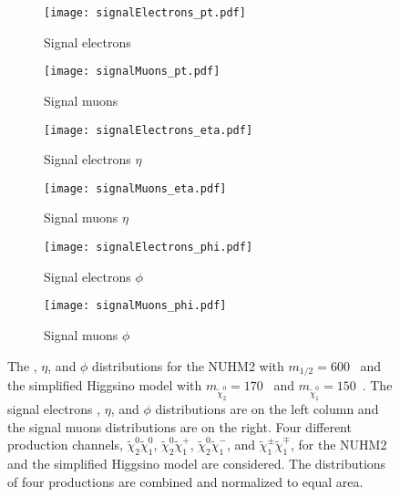 \begin{figure}[htbp]
    \begin{center}
        \begin{subfigure}[b]{0.48\textwidth}
            \texttt{[image: signalElectrons\_pt.pdf]}
            \caption{Signal electrons \pt}
        \end{subfigure}
        \begin{subfigure}[b]{0.48\textwidth}
            \texttt{[image: signalMuons\_pt.pdf]}
            \caption{Signal muons \pt}
        \end{subfigure}
        \begin{subfigure}[b]{0.48\textwidth}
            \texttt{[image: signalElectrons\_eta.pdf]}
            \caption{Signal electrons $\eta$}
        \end{subfigure}
        \begin{subfigure}[b]{0.48\textwidth}
            \texttt{[image: signalMuons\_eta.pdf]}
            \caption{Signal muons $\eta$}
        \end{subfigure}
        \begin{subfigure}[b]{0.48\textwidth}
            \texttt{[image: signalElectrons\_phi.pdf]}
            \caption{Signal electrons $\phi$}
        \end{subfigure}
        \begin{subfigure}[b]{0.48\textwidth}
            \texttt{[image: signalMuons\_phi.pdf]}
            \caption{Signal muons $\phi$}
        \end{subfigure}
    \end{center}
    \caption{The \pt, $\eta$, and $\phi$ distributions for the NUHM2 with $m_{1/2} = 600$~{\GeV} and the simplified Higgsino model with $m_{\widetilde{\chi}^{0}_{2}}=170$~{\GeV} and $m_{\widetilde{\chi}^{0}_{1}}=150$~{\GeV}.
    The signal electrons \pt, $\eta$, and $\phi$ distributions are on the left column and the signal muons distributions are on the right.
    Four different production channels, $\widetilde{\chi}^{0}_{2}\widetilde{\chi}^{0}_{1}$, $\widetilde{\chi}^{0}_{2}\widetilde{\chi}^{+}_{1}$, $\widetilde{\chi}^{0}_{2}\widetilde{\chi}^{-}_{1}$, and $\widetilde{\chi}^{\pm}_{1}\widetilde{\chi}^{\mp}_{1}$, for the NUHM2 and the simplified Higgsino model are considered.
    The distributions of four productions are combined and normalized to equal area.}
    \label{fig:results_nuhm2_leptons_pt_eta_phi}
\end{figure}

